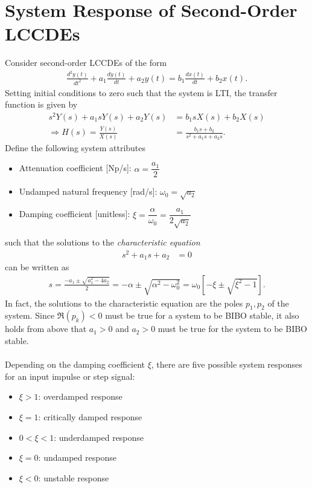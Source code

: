 \documentclass{report}
\begin{document}
\section{System Response of Second-Order LCCDEs}
Consider second-order LCCDEs of the form 
\begin{align}
    \frac{d^2y(t)}{dt^2} + a_1\frac{dy(t)}{dt} + a_2y(t) = b_1\frac{dx(t)}{dt} + b_2x(t).
\end{align}
Setting initial conditions to zero such that the system is LTI, the transfer function is given by 
\begin{align}
    s^2Y(s) + a_1sY(s) + a_2Y(s) &= b_1sX(s) + b_2X(s) \nonumber \\
    \Longrightarrow H(s) = \frac{Y(s)}{X(s)} &= \frac{b_1s+b_2}{s^2+a_1s+a_2s}.
\end{align}
Define the following system attributes
\begin{itemize}
    \item Attenuation coefficient [Np/s]: $\alpha = \dfrac{a_1}{2}$
    \item Undamped natural frequency [rad/s]: $\omega_0 = \sqrt{a_2}$
    \item Damping coefficient [unitless]: $\xi = \dfrac{\alpha}{\omega_0} = \dfrac{a_1}{2\sqrt{a_2}}$
\end{itemize}
such that the solutions to the \emph{characteristic equation}
\begin{align}
    s^2 + a_1s + a_2 &= 0
\end{align}
can be written as 
\begin{align}
    s = \frac{-a_1\pm\sqrt{a_1^2-4a_2}}{2} = -\alpha \pm \sqrt{\alpha^2-\omega_0^2} = \omega_0\left[-\xi\pm\sqrt{\xi^2-1}\right].
\end{align}
In fact, the solutions to the characteristic equation are the poles $p_1, p_2$ of the system. Since $\Re(p_k) < 0$ must be true for a system to be BIBO stable, 
it also holds from above that $a_1>0$ and $a_2>0$ must be true for the system to be BIBO stable.
\\ \\
Depending on the damping coefficient $\xi$, there are five possible system responses for an input impulse or step signal:
\begin{itemize}
    \item $\xi > 1$: overdamped response
    \item $\xi = 1$: critically damped response
    \item $0 < \xi < 1$: underdamped response
    \item $\xi = 0$: undamped response
    \item $\xi < 0$: unstable response
\end{itemize}
\end{document}
